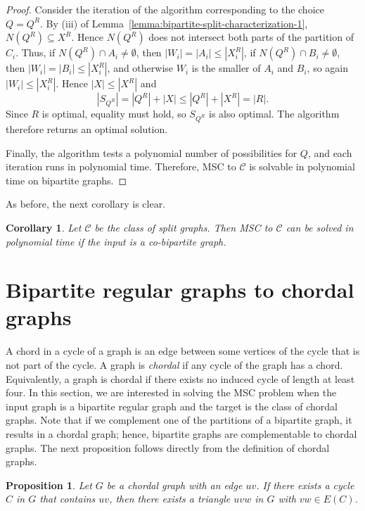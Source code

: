 \documentclass[11pt]{article}
\newtheorem{proposition}[theorem]{Proposition}
\newtheorem{corollary}[theorem]{Corollary}
\theoremstyle{definition}
\begin{document}
\begin{proof}
Consider the iteration of the algorithm corresponding to the choice $Q=Q^R$.  
By (iii) of Lemma~\ref{lemma:bipartite-split-characterization-1}, $N(Q^R) \subseteq X^R$.
Hence $N(Q^R)$ does not intersect both parts of the partition of $C_i$. 
Thus, if $N(Q^R) \cap A_i \neq \emptyset$, then $|W_i|=|A_i|\leq |X_i^R|$, 
if $N(Q^R) \cap B_i \neq \emptyset$, then $|W_i|=|B_i|\leq |X_i^R|$, 
and otherwise $W_i$ is the smaller of $A_i$ and $B_i$, so again $|W_i|\leq |X_i^R|$.
Hence $|X|\leq |X^R|$ and 
\[
|S_{Q^R}| = |Q^R| + |X| \le |Q^R| + |X^R| = |R|.
\]
Since $R$ is optimal, equality must hold, so $S_{Q^R}$ is also optimal.  
The algorithm therefore returns an optimal solution.

Finally, the algorithm tests a polynomial number of possibilities for $Q$, and each iteration runs in polynomial time.  
Therefore, MSC to $\mathcal{C}$ is solvable in polynomial time on bipartite graphs.
\end{proof}

As before, the next corollary is clear.


\begin{corollary}
    \label{cor:co-bipartite-split}
Let $\mathcal{C}$ be the class of split graphs.  
Then MSC to $\mathcal{C}$ can be solved in polynomial time if the input is a co-bipartite graph.
\end{corollary}


\section{Bipartite regular graphs to chordal graphs}
\label{section:bipartite-to-chordals}

A chord in a cycle of a graph is an edge between some vertices of the cycle that is not part of the cycle.
A graph is \emph{chordal} if any cycle of the graph has a chord. Equivalently, a graph is chordal if there exists no induced cycle of length at least four.
In this section, we are interested in solving the MSC problem when the input graph is a bipartite 
regular graph and the target is the class of chordal graphs.
Note that if we complement one of the partitions of a bipartite graph, it results in a chordal graph; hence, bipartite graphs are complementable to chordal graphs.
The next proposition follows directly from the definition of chordal graphs.
\begin{proposition}\label{prop:cycleimpliestriangle}
Let $G$ be a chordal graph with an edge $uv$.
If there exists a cycle $C$ in $G$ that contains $uv$, then there exists a triangle $uvw$ in $G$ with $vw \in E(C)$.
\end{proposition}
\end{document}
